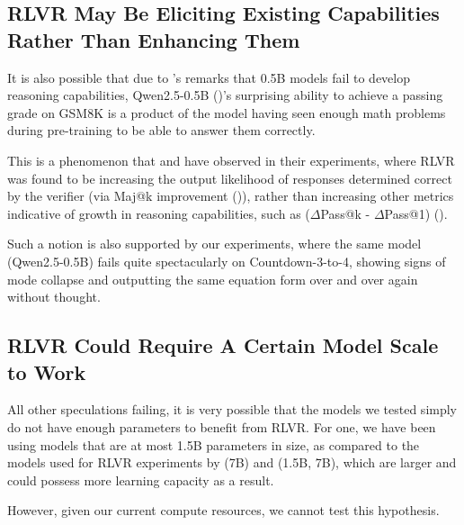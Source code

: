 \documentclass{article} %
\theoremstyle{definition}
\begin{document}
\subsection{RLVR May Be Eliciting Existing Capabilities Rather Than Enhancing Them}
It is also possible that due to \cite{tinyzero}'s remarks that 0.5B models fail to develop reasoning capabilities,
Qwen2.5-0.5B (\cite{Qwen-et-al-2025})'s surprising ability to achieve a passing grade on GSM8K is a product of the model having
seen enough math problems during pre-training to be able to answer them correctly.

This is a phenomenon that \cite{grpo} and \cite{Yue-et-al-2025} have observed in their experiments,
where RLVR was found to be increasing the output likelihood of responses determined correct
by the verifier (via Maj@k improvement (\cite{grpo})), rather than increasing other metrics indicative of growth in 
reasoning capabilities, such as ($\Delta$Pass@k - $\Delta$Pass@1) (\cite{Yue-et-al-2025}).

Such a notion is also supported by our experiments, where the same model (Qwen2.5-0.5B)
fails quite spectacularly on Countdown-3-to-4, showing signs of mode collapse 
and outputting the same equation form over and over again without thought.

\subsection{RLVR Could Require A Certain Model Scale to Work}
All other speculations failing, it is very possible that the models we tested
simply do not have enough parameters to benefit from RLVR.
For one, we have been using models that are at most 1.5B parameters in size,
as compared to the models used for RLVR experiments by \cite{grpo} (7B) and \cite{Liu-et-al-2025} (1.5B, 7B),
which are larger and could possess more learning capacity as a result.

However, given our current compute resources, we cannot test this hypothesis.



\appendix
\end{document}
